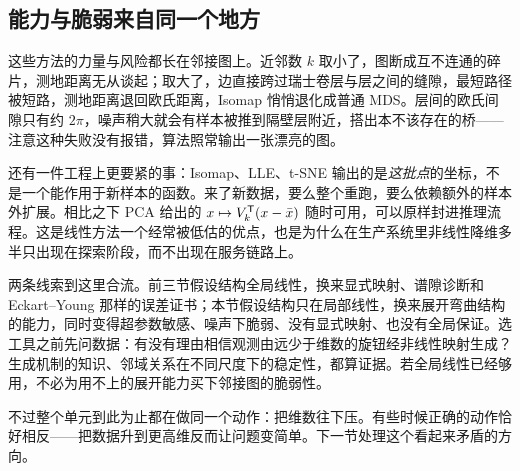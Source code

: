 \subsection{能力与脆弱来自同一个地方}

这些方法的力量与风险都长在邻接图上。近邻数 \(k\) 取小了，图断成互不连通的碎片，测地距离无从谈起；取大了，边直接跨过瑞士卷层与层之间的缝隙，最短路径被短路，测地距离退回欧氏距离，Isomap 悄悄退化成普通 MDS。层间的欧氏间隙只有约 \(2\pi\)，噪声稍大就会有样本被推到隔壁层附近，搭出本不该存在的桥——注意这种失败没有报错，算法照常输出一张漂亮的图。

还有一件工程上更要紧的事：Isomap、LLE、t-SNE 输出的是\emph{这批点}的坐标，不是一个能作用于新样本的函数。来了新数据，要么整个重跑，要么依赖额外的样本外扩展。相比之下 PCA 给出的 \(x\mapsto V_k^{\mathsf{T}}(x-\bar x)\) 随时可用，可以原样封进推理流程。这是线性方法一个经常被低估的优点，也是为什么在生产系统里非线性降维多半只出现在探索阶段，而不出现在服务链路上。

两条线索到这里合流。前三节假设结构全局线性，换来显式映射、谱隙诊断和 Eckart--Young 那样的误差证书；本节假设结构只在局部线性，换来展开弯曲结构的能力，同时变得超参数敏感、噪声下脆弱、没有显式映射、也没有全局保证。选工具之前先问数据：有没有理由相信观测由远少于维数的旋钮经非线性映射生成？生成机制的知识、邻域关系在不同尺度下的稳定性，都算证据。若全局线性已经够用，不必为用不上的展开能力买下邻接图的脆弱性。

不过整个单元到此为止都在做同一个动作：把维数往下压。有些时候正确的动作恰好相反——把数据升到更高维反而让问题变简单。下一节处理这个看起来矛盾的方向。
